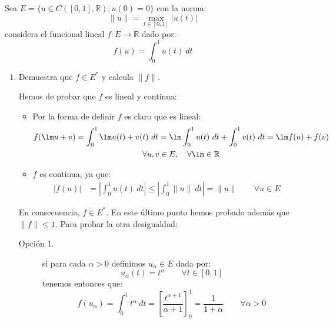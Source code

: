 \begin{ejercicio}
    Sea $E = \{u\in C([0,1],\mathbb{R}) : u(0) = 0\}$ con la norma:
    \begin{equation*}
        \|u\| = \max_{t\in [0,1]}|u(t)|
    \end{equation*}
    considera el funcional lineal $f:E\to \mathbb{R}$ dado por:
    \begin{equation*}
        f(u) = \int_{0}^{1} u(t)~dt 
    \end{equation*}
    \begin{enumerate}[label=\alph*)]
        \item Demuestra que $f\in E^\ast$ y calcula $\|f\|$.

            Hemos de probar que $f$ es lineal y continua:
            \begin{itemize}
                \item Por la forma de definir $f$ es claro que es lineal:
                    \begin{multline*}
                        f(\lm u + v) = \int_{0}^{1} \lm u(t) + v(t)~dt  = \lm \int_{0}^{1} u(t)~dt  + \int_{0}^{1} v(t)~dt  = \lm f(u) + f(v) \\ \forall u,v\in E, \quad  \forall \lm \in \mathbb{R}
                    \end{multline*}
                \item $f$ es continua, ya que:
                    \begin{align*}
                        |f(u)| &= \left|\int_{0}^{1} u(t)~dt \right| \leq \left|\int_{0}^{1} \|u\|~dt \right| = \|u\| \qquad \forall u\in E
                    \end{align*}
            \end{itemize}
            En consecuencia, $f\in E^\ast$. En este último punto hemos probado además que $\|f\|\leq 1$. Para probar la otra desigualdad: 
            \begin{description}
                \item [Opción 1.] si para cada $\alpha>0$ definimos $u_\alpha \in E$ dada por:
                    \begin{equation*}
                        u_\alpha(t) = t^{\alpha} \qquad \forall t\in [0,1]
                    \end{equation*}
                    tenemos entonces que:
                    \begin{equation*}
                        f(u_\alpha) = \int_{0}^{1} t^{\alpha}~dt  = \left[\dfrac{t^{\alpha+1}}{\alpha+1}\right]^1_0 = \dfrac{1}{1+\alpha} \qquad \forall \alpha>0

\end{equation*}
\end{description}
\end{enumerate}
\end{ejercicio}
